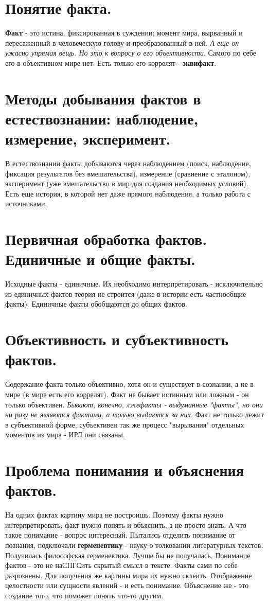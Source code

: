 \section{ Понятие факта.}
\textbf{Факт} - это истина, фиксированная в суждении; момент мира, вырванный и пересаженный в человеческую голову и преобразованный в ней. \textit{А еще он ужасно упрямая вещь. Но это к вопросу о его объективности}. Самого по себе его в объективном мире нет. Есть только его коррелят - \textbf{эквифакт}.

\section{ Методы добывания фактов в естествознании: наблюдение, измерение, эксперимент.}
В естествознании факты добываются через наблюдением (поиск, наблюдение, фиксация результатов без вмешательства), измерение (сравнение с эталоном), эксперимент (уже вмешательство в мир для создания необходимых условий). Есть еще история, в которой нет даже прямого наблюдения, а только работа с источниками.

\section{ Первичная обработка фактов. Единичные и общие факты.}
Исходные факты - единичные. Их необходимо интерпретировать - исключительно из единичных фактов теория не строится (даже в истории есть частнообщие факты). Единичные факты обобщаются до общих фактов.

\section{ Объективность и субъективность фактов.}
Содержание факта только объективно, хотя он и существует в сознании, а не в мире (в мире есть его коррелят). Факт не бывает истинным или ложным - он только объективен. \textit{Бывают, конечно, лжефакты - выдуманные "факты", но они ни разу не являются фактами, а только выдаются за них.} Факт не только лежит в субъективной форме, субъективен так же процесс "вырывания" отдельных моментов из мира - ИРЛ они связаны.

\section{ Проблема понимания и объяснения фактов.}
На одних фактах картину мира не построишь. Поэтому факты нужно интерпретировать; факт нужно понять и объяснить, а не просто знать. А что такое понимание - вопрос интересный. Пытались отделить понимание от познания, подключали \textbf{герменевтику} - науку о толковании литературных текстов. Получилась философская герменевтика. Лучше бы не получалась. Понимание фактов - это не наСПГСить скрытый смысл в тексте. Факты сами по себе разрознены. Для получения же картины мира их нужно склеить. Отображение целостности или сущности явлений - и есть понимание. Объяснение же - это создание того, что поможет понять что-то другим.

